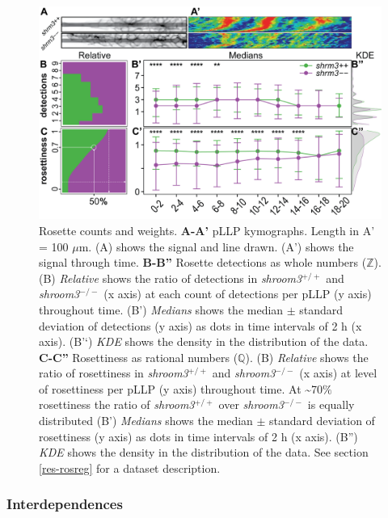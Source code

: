 \documentclass[11pt,singlespacinge,twoside]{reedthesis} %
\theoremstyle{definition}
\theoremstyle{definition}
\theoremstyle{definition}
\theoremstyle{remark}
\begin{document}
\begin{figure}

{\centering \includegraphics[width=0.95\linewidth]{figures/results/03_rosettes/detection} 

}

\caption[Rosette counts and weights]{Rosette counts and weights. \textbf{A-A'} pLLP kymographs. Length in A' = 100 \(\mu\)m. (A) shows the signal and line drawn. (A') shows the signal through time. \textbf{B-B''} Rosette detections as whole numbers (\(\mathbb{Z}\)). (B) \emph{Relative} shows the ratio of detections in \emph{shroom3}\(^{+/+}\) and \emph{shroom3}\(^{-/-}\) (x axis) at each count of detections per pLLP (y axis) throughout time. (B') \emph{Medians} shows the median \(\pm\) standard deviation of detections (y axis) as dots in time intervals of 2 h (x axis). (B'`) \emph{KDE} shows the density in the distribution of the data. \textbf{C-C''} Rosettiness as rational numbers (\(\mathbb{Q}\)). (B) \emph{Relative} shows the ratio of rosettiness in \emph{shroom3}\(^{+/+}\) and \emph{shroom3}\(^{-/-}\) (x axis) at level of rosettiness per pLLP (y axis) throughout time. At \textasciitilde70\(\%\) rosettiness the ratio of \emph{shroom3}\(^{+/+}\) over \emph{shroom3}\(^{-/-}\) is equally distributed (B') \emph{Medians} shows the median \(\pm\) standard deviation of rosettiness (y axis) as dots in time intervals of 2 h (x axis). (B'') \emph{KDE} shows the density in the distribution of the data. See section \ref{res-rosreg} for a dataset description.}\label{fig:rdtdet}
\end{figure}
\hypertarget{interdependences}{%
\subsubsection{Interdependences}\label{interdependences}}
\end{document}
